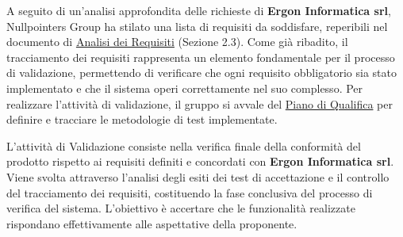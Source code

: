 A seguito di un’analisi approfondita delle richieste di \textbf{Ergon Informatica srl}, Nullpointers Group ha stilato una lista di requisiti da soddisfare, reperibili nel documento di \href{https://nullpointersgroup.github.io/Documentazione/output/RTB/Documenti%20Esterni/Analisi_dei_Requisiti.pdf}{Analisi dei Requisiti} (Sezione 2.3).
Come già ribadito, il tracciamento dei requisiti rappresenta un elemento fondamentale per il processo di validazione, permettendo di verificare che ogni requisito obbligatorio sia stato implementato e che il sistema operi correttamente nel suo complesso. 
Per realizzare l’attività di validazione, il gruppo si avvale del \href{https://nullpointersgroup.github.io/Documentazione/output/RTB/Documenti%20Esterni/Piano_di_Qualifica.pdf}{Piano di Qualifica} per definire e tracciare le metodologie di test implementate.

L’attività di Validazione consiste nella verifica finale della conformità del prodotto rispetto ai requisiti definiti e concordati con \textbf{Ergon Informatica srl}.\\
Viene svolta attraverso l’analisi degli esiti dei test di accettazione e il controllo del tracciamento dei requisiti, costituendo la fase conclusiva del processo di verifica del sistema. L'obiettivo è accertare che le funzionalità realizzate rispondano effettivamente alle aspettative della proponente.